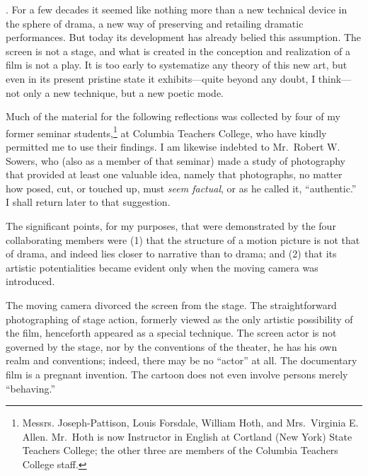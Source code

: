 \documentclass{tufte-handout}
\begin{document}
\begin{titlepage}
. For a few decades it seemed like noth­ing more than a
new technical device in the sphere of drama, a new way of preserving and
retailing dramatic performances. But today its devel­opment has already
belied this assumption. The screen is not a stage, and what is created
in the conception and realization of a film is not a play. It is too
early to systematize any theory of this new art, but even in its present
pristine state it exhibits---quite beyond any doubt, I think---not only
a new technique, but a new poetic mode.

Much of the material for the following reflections was collected by four
of my former seminar students,\footnote{Messrs. Joseph-Pattison, Louis
  Forsdale, William Hoth, and Mrs.~Virginia E. Allen. Mr.~Hoth is now
  Instructor in English at Cortland (New York) State Teachers College;
  the other three are members of the Columbia Teachers College staff.}
at Columbia Teachers College, who have kindly permitted me to use their
findings. I am likewise indebted to Mr.~Robert W. Sowers, who (also as a
member of that seminar) made a study of photography that provided at
least one valuable idea, namely that photographs, no matter how posed,
cut, or touched up, must \emph{seem factual}, or as he called it,
``authentic.'' I shall return later to that sug­gestion.

The significant points, for my purposes, that were demonstrated by the
four collaborating members were (1) that the structure of a motion
picture is not that of drama, and indeed lies closer to narrative than
to drama; and (2) that its artistic potentialities became evident only
when the moving camera was introduced.

The moving camera divorced the screen from the stage. The
straight­forward photographing of stage action, formerly viewed as the
only artistic possibility of the film, henceforth appeared as a special
technique. The screen actor is not governed by the stage, nor by the
conventions of the theater, he has his own realm and conventions;
indeed, there may be no ``actor'' at all. The documentary film is a
pregnant invention. The cartoon does not even involve persons merely
``behaving.''

\enlargethispage{2\baselineskip}

\vspace*{4em}



 \end{titlepage}
\end{document}
